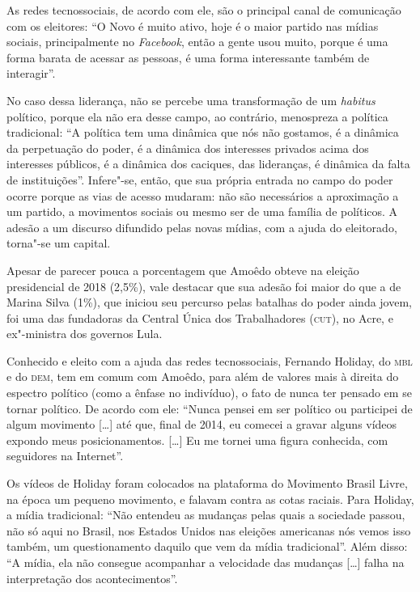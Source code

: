 As redes tecnossociais, de acordo com ele, são o principal canal de
comunicação com os eleitores: ``O Novo é muito ativo, hoje é o maior
partido nas mídias sociais, principalmente no \emph{Facebook}, então a
gente usou muito, porque é uma forma barata de acessar as pessoas, é uma
forma interessante também de interagir''.

No caso dessa liderança, não se percebe uma transformação de um
\emph{habitus} político, porque ela não era desse campo, ao contrário,
menospreza a política tradicional: ``A política tem uma dinâmica que nós
não gostamos, é a dinâmica da perpetuação do poder, é a dinâmica dos
interesses privados acima dos interesses públicos, é a dinâmica dos
caciques, das lideranças, é dinâmica da falta de instituições''.
Infere"-se, então, que sua própria entrada no campo do poder ocorre
porque as vias de acesso mudaram: não são necessários a aproximação a um
partido, a movimentos sociais ou mesmo ser de uma família de políticos.
A adesão a um discurso difundido pelas novas mídias, com a ajuda do
eleitorado, torna"-se um capital.

Apesar de parecer pouca a porcentagem que Amoêdo obteve na eleição
presidencial de 2018 (2,5\%), vale destacar que sua adesão foi maior do
que a de Marina Silva (1\%), que iniciou seu percurso pelas batalhas do
poder ainda jovem, foi uma das fundadoras da Central Única dos
Trabalhadores (\textsc{cut}), no Acre, e ex"-ministra dos governos Lula.

Conhecido e eleito com a ajuda das redes tecnossociais, Fernando
Holiday, do \textsc{mbl} e do \textsc{dem}, tem em comum com Amoêdo, para além de valores
mais à direita do espectro político (como a ênfase no indivíduo), o fato
de nunca ter pensado em se tornar político. De acordo com ele: ``Nunca
pensei em ser político ou participei de algum movimento {[}\ldots{}{]} até
que, final de 2014, eu comecei a gravar alguns vídeos expondo meus
posicionamentos. {[}\ldots{}{]} Eu me tornei uma figura conhecida, com
seguidores na Internet''.

Os vídeos de Holiday foram colocados na plataforma do Movimento Brasil
Livre, na época um pequeno movimento, e falavam contra as cotas raciais.
Para Holiday, a mídia tradicional: ``Não entendeu as mudanças pelas
quais a sociedade passou, não só aqui no Brasil, nos Estados Unidos nas
eleições americanas nós vemos isso também, um questionamento daquilo que
vem da mídia tradicional''. Além disso: ``A mídia, ela não consegue
acompanhar a velocidade das mudanças {[}\ldots{}{]} falha na interpretação
dos acontecimentos''.


